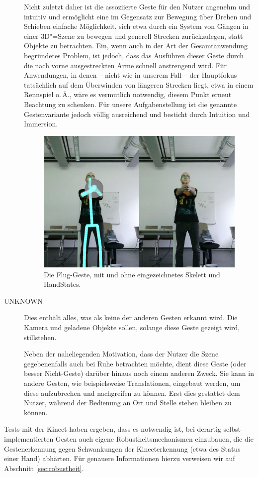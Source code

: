 \begin{description}
		Nicht zuletzt daher ist die assoziierte Geste für den Nutzer angenehm und intuitiv und ermöglicht eine im Gegensatz zur Bewegung über Drehen und Schieben einfache Möglichkeit, sich etwa durch ein System von Gängen in einer 3D"=Szene zu bewegen und generell Strecken zurückzulegen, statt Objekte zu betrachten. Ein, wenn auch in der Art der Gesamtanwendung begründetes Problem, ist jedoch, dass das Ausführen dieser Geste durch die nach vorne ausgestreckten Arme schnell anstrengend wird. Für Anwendungen, in denen -- nicht wie in unserem Fall -- der Hauptfokus tatsächlich auf dem Überwinden von längeren Strecken liegt, etwa in einem Rennspiel o.\,Ä., wäre es vermutlich notwendig, diesem Punkt erneut Beachtung zu schenken. Für unsere Aufgabenstellung ist die genannte Gestenvariante jedoch völlig ausreichend und besticht durch Intuition und Immersion.
		\begin{figure}[h!]
		\centering
		\includegraphics[width=.8\textwidth]{pictures/fly_.png}
		\caption{Die Flug-Geste, mit und ohne eingezeichnetes Skelett und HandStates.}\label{fig:flyg}
		\end{figure}\par		
		\item[UNKNOWN] Dies enthält alles, was als keine der anderen Gesten erkannt wird. Die Kamera und geladene Objekte sollen, solange diese Geste gezeigt wird, stillstehen.\par
		Neben der naheliegenden Motivation, dass der Nutzer die Szene gegebenenfalls auch bei Ruhe betrachten möchte, dient diese \glqq Geste\grqq{} (oder besser \glqq Nicht-Geste\grqq{}) darüber hinaus noch einem anderen Zweck. Sie kann in andere Gesten, wie beispielsweise Translationen, eingebaut werden, um diese aufzubrechen und \glqq nachgreifen\grqq{} zu können. Erst dies gestattet dem Nutzer, während der Bedienung an Ort und Stelle stehen bleiben zu können.
	\end{description}
	Tests mit der Kinect haben ergeben, dass es notwendig ist, bei derartig selbst implementierten Gesten auch eigene Robustheitsmechanismen einzubauen, die die Gestenerkennung gegen Schwankungen der Kinecterkennung (etwa des Status einer Hand) abhärten. Für genauere Informationen hierzu verweisen wir auf Abschnitt \ref{sec:robustheit}.
